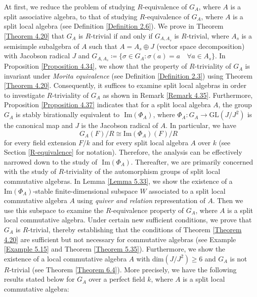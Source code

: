 \documentclass[12pt]{amsart}
\theoremstyle{definition}
\numberwithin{equation}{section}
\begin{document}
\vspace{0.2in}
\noindent
At first, we reduce the problem of studying $R$-equivalence of $G_A$, where $A$ is a split associative algebra, to that of studying $R$-equivalence of $G_A$, where $A$ is a split local algebra (see Definition \ref{Definition 2.6}).
\vskip2mm 
\noindent
We prove in Theorem \ref{Theorem 4.20} that $G_A$ is $R$-trivial if and only if $G_{A,A_s}$ is $R$-trivial, where $A_s$ is a semisimple subalgebra of $A$ such that $A=A_s\oplus J$ (vector space decomposition) with Jacobson radical $J$ and $G_{A,A_s}\coloneqq\{\sigma\in G_A: \sigma(a)=a \quad \forall a\in A_s\}$. In Proposition \ref{Proposition 4.34}, we show that the property of $R$-triviality of $G_A$ is invariant under \emph{Morita equivalence} (see Definition \ref{Definition 2.3}) using Theorem \ref{Theorem 4.20}. Consequently, it suffices to examine split local algebras in order to investigate $R$-triviality of $G_A$ as shown in Remark \ref{Remark 4.35}. Furthermore, Proposition \ref{Proposition 4.37} indicates that for a split local algebra $A$, the group $G_A$ is stably birationally equivalent to $\text{ Im}(\Phi_A)$, where $\Phi_A: G_A\rightarrow \mathrm{GL}(J/J^2)$ is the canonical map and $J$ is the Jacobson radical of $A$. In particular, we have \[G_A(F)/R\cong \mathrm{Im}(\Phi_A)(F)/R\] for every field extension $F/k$ and for every split local algebra $A$ over $k$ (see Section \ref{R-equivalence} for notation). Therefore, the analysis can be effectively narrowed down to the study of $\text{ Im}(\Phi_A)$.
\vskip4mm
\noindent
Thereafter, we are primarily concerned with the study of $R$-triviality of the automorphism groups of split local commutative algebras. In Lemma \ref{Lemma 5.33}, we show the existence of a $\mathrm{Im}(\Phi_A)$-stable finite-dimensional subspace $W$ associated to a split local commutative algebra $A$ using \emph{quiver and relation} representation of $A$. Then we use this subspace to examine the $R$-equivalence property of $G_A$, where $A$ is a split local commutative algebra. Under certain new sufficient conditions, we prove that $G_A$ is $R$-trivial, thereby establishing that the conditions of Theorem \ref{Theorem 4.20} are sufficient but not necessary for commutative algebras (see Example \ref{Example 5.15} and Theorem \ref{Theorem 5.35}). Furthermore, we show the existence of a local commutative algebra $A$ with $\text{dim}(J/J^2)\geq 6$ and $G_A$ is not $R$-trivial (see Theorem \ref{Theorem 6.4}). More precisely, we have the following results stated below for $G_A$ over a perfect field $k$, where $A$ is a split local commutative algebra:
\vspace{0.2in}
\end{document}
